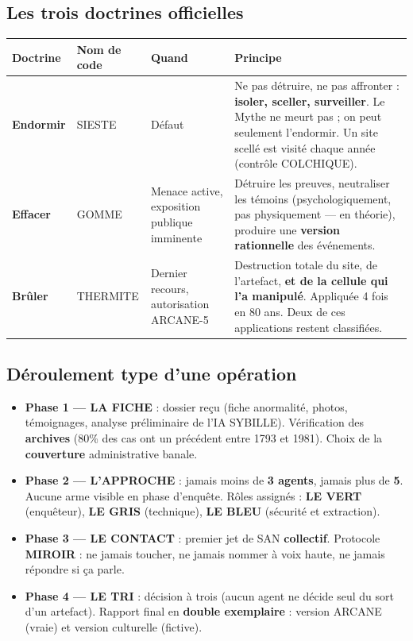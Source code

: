 \documentclass[10pt,a5paper,twoside]{book}
\begin{document}
\subsection{Les trois doctrines officielles}

\begin{center}
\begin{tabular}{|P{2.0cm}|P{2.0cm}|P{3.0cm}|P{3.5cm}|}
\hline
\textbf{Doctrine} & \textbf{Nom de code} & \textbf{Quand} & \textbf{Principe} \\
\hline
\textbf{Endormir} & SIESTE & Défaut & Ne pas détruire, ne pas affronter : \textbf{isoler, sceller, surveiller}. Le Mythe ne meurt pas ; on peut seulement l'endormir. Un site scellé est visité chaque année (contrôle COLCHIQUE). \\
\hline
\textbf{Effacer} & GOMME & Menace active, exposition publique imminente & Détruire les preuves, neutraliser les témoins (psychologiquement, pas physiquement --- en théorie), produire une \textbf{version rationnelle} des événements. \\
\hline
\textbf{Brûler} & THERMITE & Dernier recours, autorisation ARCANE-5 & Destruction totale du site, de l'artefact, \textbf{et de la cellule qui l'a manipulé}. Appliquée 4 fois en 80 ans. Deux de ces applications restent classifiées. \\
\hline
\end{tabular}
\end{center}

\subsection{Déroulement type d'une opération}

\begin{itemize}
\item \textbf{Phase 1 — LA FICHE} : dossier reçu (fiche anormalité, photos, témoignages, analyse préliminaire de l'IA SYBILLE). Vérification des \textbf{archives} (80\% des cas ont un précédent entre 1793 et 1981). Choix de la \textbf{couverture} administrative banale.
\item \textbf{Phase 2 — L'APPROCHE} : jamais moins de \textbf{3 agents}, jamais plus de \textbf{5}. Aucune arme visible en phase d'enquête. Rôles assignés : \textbf{LE VERT} (enquêteur), \textbf{LE GRIS} (technique), \textbf{LE BLEU} (sécurité et extraction).
\item \textbf{Phase 3 — LE CONTACT} : premier jet de SAN \textbf{collectif}. Protocole \textbf{MIROIR} : ne jamais toucher, ne jamais nommer à voix haute, ne jamais répondre si \og ça \fg{} parle.
\item \textbf{Phase 4 — LE TRI} : décision à trois (aucun agent ne décide seul du sort d'un artefact). Rapport final en \textbf{double exemplaire} : version ARCANE (vraie) et version \og culturelle \fg{} (fictive).
\end{itemize}
\end{document}
